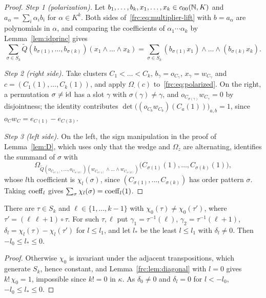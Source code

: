 \begin{proof}
\emph{Step 1 (polarization).} Let $b_1,\dots,b_k,x_1,\dots,x_k\in c_{00}(\mathbb N,K)$ and $a_\alpha=\sum_i\alpha_ib_i$ for
$\alpha\in K^k$. Both sides of~\eqref{frc:eq:multiplier-lift} with $b=a_\alpha$ are polynomials in $\alpha$, and
comparing the coefficients of $\alpha_1\cdots\alpha_k$ by Lemma~\ref{lem:idprinc} gives
\begin{equation}\label{frc:eq:polarized}
 \sum_{\sigma\in S_k}\widetilde Q(b_{\sigma(1)},\dots,b_{\sigma(k)})(x_1\wedge\dots\wedge x_k)
 =\sum_{\sigma\in S_k}(b_{\sigma(1)}x_1)\wedge\dots\wedge(b_{\sigma(k)}x_k).
\end{equation}

\emph{Step 2 (right side).} Take clusters $C_1<\dots<C_k$, $b_\gamma=o_{C_\gamma}$, $x_\gamma=w_{C_\gamma}$ and
$c=(C_1(1),\dots,C_k(1))$, and apply $\Omega_\cdot(c)$ to~\eqref{frc:eq:polarized}. On the right, a permutation
$\sigma\ne\mathrm{id}$ has a slot $\gamma$ with $\sigma(\gamma)\ne\gamma$, and $o_{C_{\sigma(\gamma)}}w_{C_\gamma}=0$ by
disjointness; the identity contributes $\det\bigl((o_{C_b}w_{C_b})(C_a(1))\bigr)_{a,b}=1$, since
$o_Cw_C=e_{C(1)}-e_{C(3)}$.

\emph{Step 3 (left side).} On the left, the sign manipulation in the proof of Lemma~\ref{lem:D}, which uses only that the
wedge and $\Omega_z$ are alternating, identifies the summand of $\sigma$ with
\[
 \Omega_{\widetilde Q(o_{C_{\sigma(1)}},\dots,o_{C_{\sigma(k)}})(w_{C_{\sigma(1)}}\wedge\dots\wedge w_{C_{\sigma(k)}})}
 \bigl(C_{\sigma(1)}(1),\dots,C_{\sigma(k)}(1)\bigr),
\]
whose $l$th coefficient is $\chi_l(\sigma)$, since $(C_{\sigma(1)},\dots,C_{\sigma(k)})$ has order pattern $\sigma$.
Taking $\operatorname{coeff}_l$ gives $\sum_\sigma\chi_l(\sigma)=\operatorname{coeff}_l(1)$.
\end{proof}

\begin{corollary}\label{frc:cor:transposition}
There are $\tau\in S_k$ and $\ell\in\{1,\dots,k-1\}$ with $\chi_0(\tau)\ne\chi_0(\tau')$, where $\tau'=(\ell\ \ell{+}1)\circ\tau$.
For such $\tau,\ell$ put $\gamma_1=\tau^{-1}(\ell)$, $\gamma_2=\tau^{-1}(\ell+1)$, $\delta_l=\chi_l(\tau)-\chi_l(\tau')$ for
$l\le l_1$, and let $l_*$ be the least $l\le l_1$ with $\delta_l\ne0$. Then $-l_0\le l_*\le0$.
\end{corollary}

\begin{proof}
Otherwise $\chi_0$ is invariant under the adjacent transpositions, which generate $S_k$, hence constant, and
Lemma~\ref{frc:lem:diagonal} with $l=0$ gives $k!\,\chi_0=1$, impossible since $k!=0$ in $\kappa$. As $\delta_0\ne0$ and
$\delta_l=0$ for $l<-l_0$, $-l_0\le l_*\le0$.
\end{proof}

